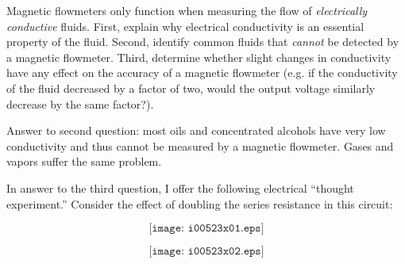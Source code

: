 

Magnetic flowmeters only function when measuring the flow of {\it electrically conductive} fluids.  First, explain why electrical conductivity is an essential property of the fluid.  Second, identify common fluids that {\it cannot} be detected by a magnetic flowmeter.  Third, determine whether slight changes in conductivity have any effect on the accuracy of a magnetic flowmeter (e.g. if the conductivity of the fluid decreased by a factor of two, would the output voltage similarly decrease by the same factor?).







Answer to second question: most oils and concentrated alcohols have very low conductivity and thus cannot be measured by a magnetic flowmeter.  Gases and vapors suffer the same problem.

\vskip 10pt

In answer to the third question, I offer the following electrical ``thought experiment.''  Consider the effect of doubling the series resistance in this circuit:

$$\texttt{[image: i00523x01.eps]}$$

\vskip 10pt

$$\texttt{[image: i00523x02.eps]}$$











